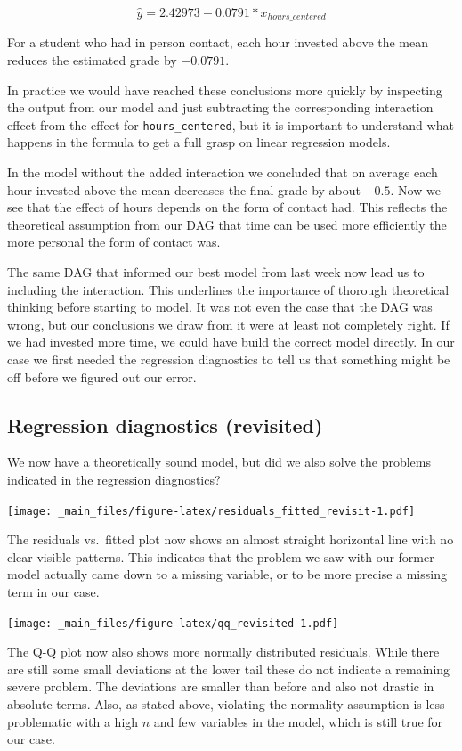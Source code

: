 \documentclass[
]{book}
\begin{document}
\[\hat{y} = 2.42973 -0.0791 *x_{hours\_centered}\]

For a student who had in person contact, each hour invested above the mean
reduces the estimated grade by \(-0.0791\).

In practice we would have reached these conclusions more quickly by inspecting
the output from our model and just subtracting the corresponding interaction
effect from the effect for \texttt{hours\_centered}, but it is important to
understand what happens in the formula to get a full grasp on linear
regression models.

In the model without the added interaction we concluded that on average each
hour invested above the mean decreases the final grade by about \(-0.5\). Now we
see that the effect of hours depends on the form of contact had. This reflects
the theoretical assumption from our DAG that time can be used more efficiently
the more personal the form of contact was.

The same DAG that informed our best model from last week now lead us to
including the interaction. This underlines the importance of thorough
theoretical thinking before starting to model. It was not even the case that
the DAG was wrong, but our conclusions we draw from it were at least not
completely right. If we had invested more time, we
could have build the correct model directly. In our case we first needed the
regression diagnostics to tell us that something might be off before we figured
out our error.

\hypertarget{regression-diagnostics-revisited}{%
\subsection{Regression diagnostics (revisited)}\label{regression-diagnostics-revisited}}

We now have a theoretically sound model, but did we also solve the problems
indicated in the regression diagnostics?

\texttt{[image: \_main\_files/figure-latex/residuals\_fitted\_revisit-1.pdf]}

The residuals vs.~fitted plot now shows an almost straight horizontal line with
no clear visible patterns.
This indicates that the problem we saw with our former model actually came down
to a missing variable, or to be more precise a missing term in our case.

\texttt{[image: \_main\_files/figure-latex/qq\_revisited-1.pdf]}

The Q-Q plot now also shows more normally distributed residuals. While there are
still some small deviations at the lower tail these do not indicate a remaining
severe problem. The deviations are smaller than before and also not drastic in
absolute terms. Also, as stated above, violating the normality assumption is less
problematic with a high \(n\) and few variables in the model, which is still true for
our case.
\end{document}
